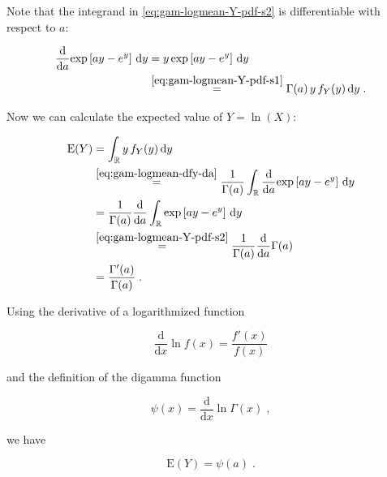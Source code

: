 \documentclass[a4paper,12pt,twoside]{book}
\begin{document}
Note that the integrand in \eqref{eq:gam-logmean-Y-pdf-s2} is differentiable with respect to $a$:

\begin{equation} \label{eq:gam-logmean-dfy-da}
\begin{split}
\frac{\mathrm{d}}{\mathrm{d}a} \mathrm{exp}\left[ ay - e^y \right] \, \mathrm{d}y &= y \, \mathrm{exp}\left[ ay - e^y \right] \, \mathrm{d}y \\
&\overset{\eqref{eq:gam-logmean-Y-pdf-s1}}{=} \Gamma(a) \, y \, f_Y(y) \, \mathrm{d}y \; .
\end{split}
\end{equation}

Now we can calculate the expected value of $Y = \ln(X)$:

\begin{equation} \label{eq:gam-logmean-E-Y-s1}
\begin{split}
\mathrm{E}(Y) &= \int_{\mathbb{R}} y \, f_Y(y) \, \mathrm{d}y \\
&\overset{\eqref{eq:gam-logmean-dfy-da}}{=} \frac{1}{\Gamma(a)} \int_{\mathbb{R}} \frac{\mathrm{d}}{\mathrm{d}a} \mathrm{exp}\left[ ay - e^y \right] \, \mathrm{d}y \\
&= \frac{1}{\Gamma(a)} \frac{\mathrm{d}}{\mathrm{d}a} \int_{\mathbb{R}} \mathrm{exp}\left[ ay - e^y \right] \, \mathrm{d}y \\
&\overset{\eqref{eq:gam-logmean-Y-pdf-s2}}{=} \frac{1}{\Gamma(a)} \frac{\mathrm{d}}{\mathrm{d}a} \Gamma(a) \\
&= \frac{\Gamma'(a)}{\Gamma(a)} \; .
\end{split}
\end{equation}

Using the derivative of a logarithmized function

\begin{equation} \label{eq:gam-logmean-log-der}
\frac{\mathrm{d}}{\mathrm{d}x} \ln f(x) = \frac{f'(x)}{f(x)}
\end{equation}

and the definition of the digamma function

\begin{equation} \label{eq:gam-logmean-psi}
\psi(x) = \frac{\mathrm{d}}{\mathrm{d}x} \ln \Gamma(x) \; ,
\end{equation}

we have

\begin{equation} \label{eq:gam-logmean-E-Y-s2}
\mathrm{E}(Y) = \psi(a) \; .
\end{equation}
\end{document}
